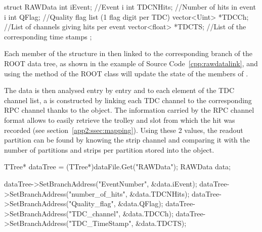 	\begin{code}
    \begin{cppcode}
struct RAWData{
    int            iEvent;   //Event i
    int            TDCNHits; //Number of hits in event i
    int            QFlag;    //Quality flag list (1 flag digit per TDC)
    vector<Uint>  *TDCCh;    //List of channels giving hits per event
    vector<float> *TDCTS;    //List of the corresponding time stamps
};
    \end{cppcode}
	\label{cpp:rawdataoff}
	\vspace{5mm}
    \end{code}
    
    Each member of the structure in then linked to the corresponding branch of the ROOT data tree, as shown in the example of Source Code~\ref{cpp:rawdatalink}, and using the method  of the ROOT class  will update the state of the members of .
    
    The data is then analysed entry by entry and to each element of the TDC channel list, a  is constructed by linking each TDC channel to the corresponding RPC channel thanks to the  object. The information carried by the RPC channel format allows to easily retrieve the trolley and slot from which the hit was recorded (see section~\ref{app2:ssec:mapping}). Using these 2 values, the readout partition can be found by knowing the strip channel and comparing it with the number of partitions and strips per partition stored into the  object.\\
	
	\begin{code}
    \begin{cppcode}
TTree*  dataTree = (TTree*)dataFile.Get("RAWData");
RAWData data;

dataTree->SetBranchAddress("EventNumber",    &data.iEvent);
dataTree->SetBranchAddress("number_of_hits", &data.TDCNHits);
dataTree->SetBranchAddress("Quality_flag",   &data.QFlag);
dataTree->SetBranchAddress("TDC_channel",    &data.TDCCh);
dataTree->SetBranchAddress("TDC_TimeStamp",  &data.TDCTS);
    \end{cppcode}
	\label{cpp:rawdatalink}
	\vspace{5mm}
    \end{code}
    
